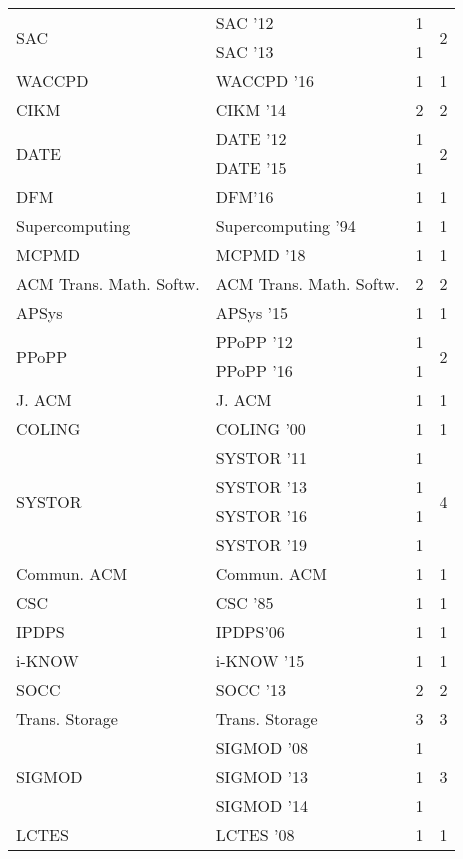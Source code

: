 \begin{table*}[t]
\begin{tabular}{llrr}
\multirow{2}{*}{SAC } & SAC '12 & 1 & \multirow{2}{*}{2}\\
& SAC '13 & 1 &\\
\multirow{1}{*}{WACCPD } & WACCPD '16 & 1 & \multirow{1}{*}{1}\\
\multirow{1}{*}{CIKM } & CIKM '14 & 2 & \multirow{1}{*}{2}\\
\multirow{2}{*}{DATE } & DATE '12 & 1 & \multirow{2}{*}{2}\\
& DATE '15 & 1 &\\
\multirow{1}{*}{DFM} & DFM'16 & 1 & \multirow{1}{*}{1}\\
\multirow{1}{*}{Supercomputing } & Supercomputing '94 & 1 & \multirow{1}{*}{1}\\
\multirow{1}{*}{MCPMD } & MCPMD '18 & 1 & \multirow{1}{*}{1}\\
\multirow{1}{*}{ACM Trans. Math. Softw.} & ACM Trans. Math. Softw. & 2 & \multirow{1}{*}{2}\\
\multirow{1}{*}{APSys } & APSys '15 & 1 & \multirow{1}{*}{1}\\
\multirow{2}{*}{PPoPP } & PPoPP '12 & 1 & \multirow{2}{*}{2}\\
& PPoPP '16 & 1 &\\
\multirow{1}{*}{J. ACM} & J. ACM & 1 & \multirow{1}{*}{1}\\
\multirow{1}{*}{COLING } & COLING '00 & 1 & \multirow{1}{*}{1}\\
\multirow{4}{*}{SYSTOR } & SYSTOR '11 & 1 & \multirow{4}{*}{4}\\
& SYSTOR '13 & 1 &\\
& SYSTOR '16 & 1 &\\
& SYSTOR '19 & 1 &\\
\multirow{1}{*}{Commun. ACM} & Commun. ACM & 1 & \multirow{1}{*}{1}\\
\multirow{1}{*}{CSC } & CSC '85 & 1 & \multirow{1}{*}{1}\\
\multirow{1}{*}{IPDPS} & IPDPS'06 & 1 & \multirow{1}{*}{1}\\
\multirow{1}{*}{i-KNOW } & i-KNOW '15 & 1 & \multirow{1}{*}{1}\\
\multirow{1}{*}{SOCC } & SOCC '13 & 2 & \multirow{1}{*}{2}\\
\multirow{1}{*}{Trans. Storage} & Trans. Storage & 3 & \multirow{1}{*}{3}\\
\multirow{3}{*}{SIGMOD } & SIGMOD '08 & 1 & \multirow{3}{*}{3}\\
& SIGMOD '13 & 1 &\\
& SIGMOD '14 & 1 &\\
\multirow{1}{*}{LCTES } & LCTES '08 & 1 & \multirow{1}{*}{1}\\

\end{tabular}
\end{table*}
